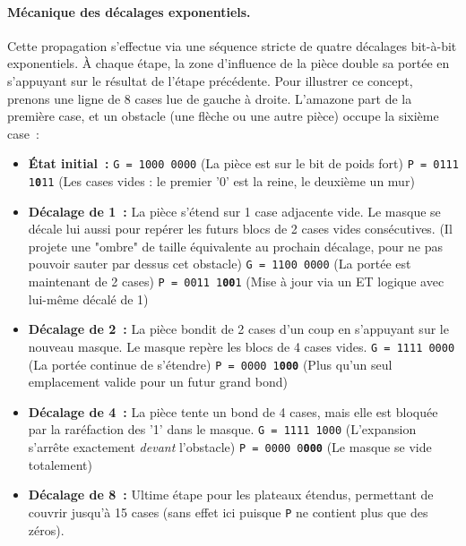 \documentclass[a4paper]{article}
\begin{document}
\paragraph{Mécanique des décalages exponentiels.}
Cette propagation s'effectue via une séquence stricte de quatre décalages bit-à-bit 
exponentiels. À chaque étape, la zone d'influence de la pièce double sa portée en s'appuyant 
sur le résultat de l'étape précédente.
Pour illustrer ce concept, prenons une ligne de 8 cases lue de gauche à droite. L'amazone part de la première case, et un obstacle (une flèche ou une autre pièce) occupe la sixième case~:
\begin{itemize}
    \item \textbf{État initial~:} 
    \newline \texttt{G = 1000 0000} (La pièce est sur le bit de poids fort)
    \newline \texttt{P = 0111 1\textbf{0}11} (Les cases vides : le premier '0' est la reine, le deuxième un mur)

    \item \textbf{Décalage de 1~:} La pièce s'étend sur 1 case adjacente vide. Le masque se décale lui aussi pour repérer les futurs blocs de 2 cases vides consécutives. (Il projete une "ombre" de taille équivalente au prochain décalage, pour ne pas pouvoir sauter par dessus cet obstacle)
    \newline \texttt{G = 1100 0000} (La portée est maintenant de 2 cases)
    \newline \texttt{P = 0011 1\textbf{00}1} (Mise à jour via un ET logique avec lui-même décalé de 1)

    \item \textbf{Décalage de 2~:} La pièce bondit de 2 cases d'un coup en s'appuyant sur le nouveau masque. Le masque repère les blocs de 4 cases vides.
    \newline \texttt{G = 1111 0000} (La portée continue de s'étendre)
    \newline \texttt{P = 0000 1\textbf{000}} (Plus qu'un seul emplacement valide pour un futur grand bond)

    \item \textbf{Décalage de 4~:} La pièce tente un bond de 4 cases, mais elle est bloquée par la raréfaction des '1' dans le masque.
    \newline \texttt{G = 1111 1000} (L'expansion s'arrête exactement \textit{devant} l'obstacle)
    \newline \texttt{P = 0000 0\textbf{000}} (Le masque se vide totalement)
    
    \item \textbf{Décalage de 8~:} Ultime étape pour les plateaux étendus, permettant de couvrir jusqu'à 15 cases (sans effet ici puisque \texttt{P} ne contient plus que des zéros).
\end{itemize}
\end{document}

